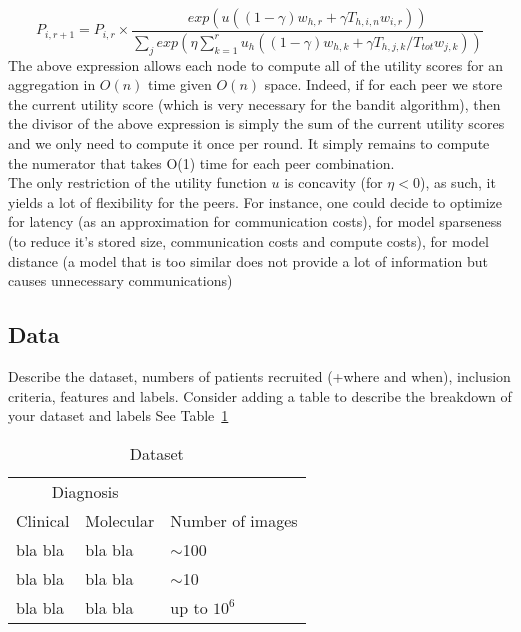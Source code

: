 \documentclass{article}
\begin{document}
    \begin{equation}
        P_{i,r+1}=P_{i,r}\times\frac{exp(u((1-\gamma)w_{h, r}+\gamma T_{h,i,n}w_{i, r}))}{\sum_{j}exp({\eta \sum_{k=1}^{r} u_h((1-\gamma)w_{h, k}+\gamma T_{h,j,k}/T_{tot}w_{j, k})})}
    \end{equation}
    The above expression allows each node to compute all of the utility scores for an aggregation in $O(n)$ time given $O(n)$ space. Indeed, if for each peer we store the current utility score (which is very necessary for the bandit algorithm), then the divisor of the above expression is simply the sum of the current utility scores and we only need to compute it once per round. It simply remains to compute the numerator that takes O(1) time for each peer combination.
    \\
    
    The only restriction of the utility function $u$ is concavity (for $\eta<0$), as such, it yields a lot of flexibility for the peers. For instance, one could decide to optimize for latency (as an approximation for communication costs), for model sparseness (to reduce it's stored size, communication costs and compute costs), for model distance (a model that is too similar does not provide a lot of information but causes unnecessary communications)
    
    
    \subsection{Data} Describe the dataset, numbers of patients recruited (+where and when), inclusion criteria, features and labels. 
        Consider adding a table to describe the breakdown of your dataset and labels
        See Table~\ref{tab:dataset}
    
    \begin{table}[h]
     \caption{Dataset}
      \centering
      \begin{tabular}{lll}
        \toprule
        \multicolumn{2}{c}{Diagnosis}                   \\
        \cmidrule(r){1-2}
        Clinical     & Molecular     & Number of images \\
        \midrule
        bla bla     & bla bla   &   $\sim$100     \\
        bla bla     & bla bla   &   $\sim$10      \\
        bla bla     & bla bla   &   up to $10^6$  \\
        \bottomrule
      \end{tabular}
      \label{tab:dataset}
    \end{table}
    
\end{document}
